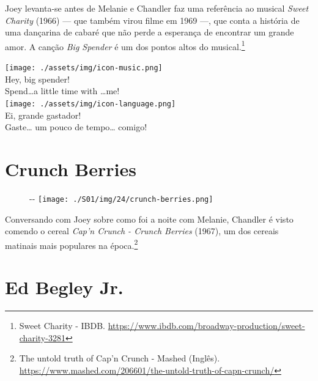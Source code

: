 Joey levanta-se antes de Melanie e Chandler faz uma referência ao
musical \emph{Sweet Charity} (1966) --- que também virou filme em 1969
---, que conta a história de uma dançarina de cabaré que não perde a
esperança de encontrar um grande amor. A canção \emph{Big Spender} é um
dos pontos altos do musical.\footnote{\sloppy Sweet Charity - IBDB. \url{https://www.ibdb.com/broadway-production/sweet-charity-3281}}

\bigskip
\begin{tcolorbox}[enhanced,
    drop fuzzy shadow southeast, boxrule=0.3pt,
    lower separated=false, sidebyside, sidebyside align=top,
    halign=flush right, halign lower=left, breakable,
    colframe=black!30!dialogoBorder,colback=musicaBg]
\texttt{[image: ./assets/img/icon-music.png]}\\
Hey, big spender!\\Spend…a little time with …me!\\
\tcblower
\texttt{[image: ./assets/img/icon-language.png]}\\
Ei, grande gastador!\\Gaste… um pouco de tempo… comigo!\\
\end{tcolorbox}

\hypertarget{crunch-berries}{%
\section{Crunch Berries}\label{crunch-berries}}

\begin{figure}[!ht]
  \begin{adjustwidth}{-\oddsidemargin-1in}{-\rightmargin}
    \centering
    \texttt{[image: ./S01/img/24/crunch-berries.png]}
  \end{adjustwidth}
\end{figure}

Conversando com Joey sobre como foi a noite com Melanie, Chandler é
visto comendo o cereal \emph{Cap'n Crunch - Crunch Berries} (1967), um
dos cereais matinais mais populares na época.\footnote{\sloppy The untold truth of Cap’n Crunch - Mashed (Inglês). \url{https://www.mashed.com/206601/the-untold-truth-of-capn-crunch/}}

\hypertarget{ed-begley-jr.}{%
\section{Ed Begley Jr.}\label{ed-begley-jr.}}

